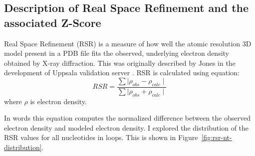 \subsection{Description of Real Space Refinement and the associated Z-Score}

Real Space Refinement (RSR) is a measure of how well the atomic resolution 3D
model present in a PDB file fits the observed, underlying electron density
obtained by X-ray diffraction. This was originally described by Jones \etal{} in
the development of Uppsala validation server \cite{Kleywegt2004a}. RSR is
calculated using equation:
\begin{equation}
  RSR = \frac{\sum \mid \rho_{obs} - \rho_{calc} \mid}
             {\sum \mid \rho_{obs} + \rho_{calc} \mid}
\end{equation}
where $\rho$ is electron density. 

In words this equation computes the normalized difference between the observed
electron density and modeled electron density. I explored the distribution of
the RSR values for all nucleotides in loops. This is shown in
Figure~\ref{fig:rsr-nt-distribution}.

